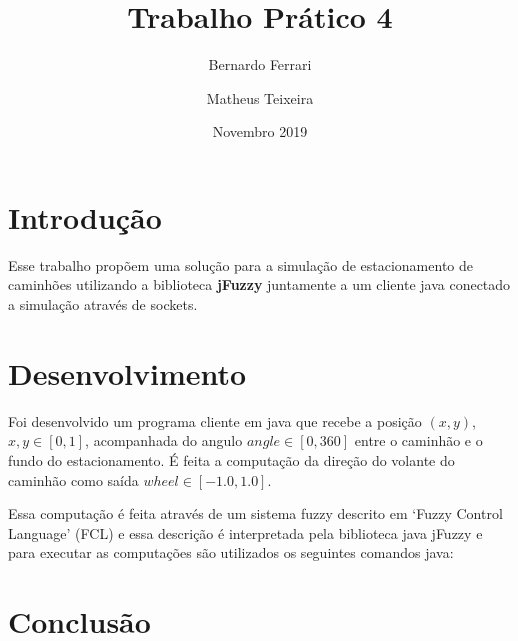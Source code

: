 \documentclass[12pt, a4paper]{article}
\title{Trabalho Prático 4}
\author{Bernardo Ferrari \and Matheus Teixeira}
\date{Novembro 2019}
\begin{document}
\maketitle

\section{Introdução}

Esse trabalho propõem uma solução para a simulação de estacionamento de
caminhões utilizando a biblioteca \textbf{jFuzzy} juntamente a um cliente
java conectado a simulação através de sockets.

\section{Desenvolvimento}

Foi desenvolvido um programa cliente em java que recebe a posição $(x, y)$, $x, y \in [0, 1]$,
acompanhada do angulo $angle \in [0, 360]$ entre o caminhão e o fundo do estacionamento.
É feita a computação da direção do volante do caminhão como saída $wheel \in [-1.0, 1.0]$.

Essa computação é feita através de um sistema fuzzy descrito em `Fuzzy Control Language' (FCL) e
essa descrição é interpretada pela biblioteca java jFuzzy e para executar as computações são
utilizados os seguintes comandos java:

\section{Conclusão}
\end{document}
